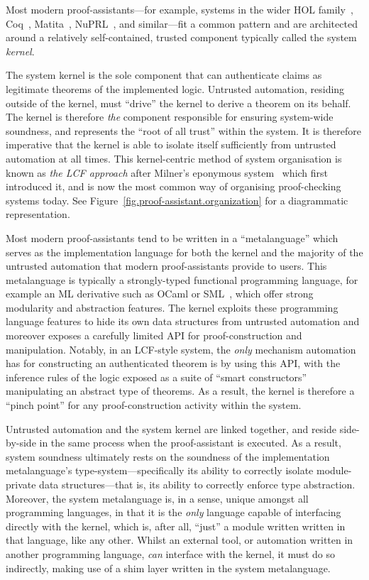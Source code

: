 \documentclass[a4paper, UKenglish, cleveref, autoref, thm-restate, colorlinks]{lipics-v2021}
\begin{document}
Most modern proof-assistants---for example, systems in the wider HOL family~\cite{10.1007/s00165-019-00492-1, DBLP:conf/tphol/Harrison09a, DBLP:conf/tphol/SlindN08}, Coq~\cite{DBLP:conf/popl/HuetH14}, Matita~\cite{DBLP:conf/cade/AspertiRCT11}, NuPRL~\cite{DBLP:conf/cade/AllenCEKL00}, and similar---fit a common pattern and are architected around a relatively self-contained, trusted component typically called the system \emph{kernel}.

The system kernel is the sole component that can authenticate claims as legitimate theorems of the implemented logic.
Untrusted automation, residing outside of the kernel, must ``drive'' the kernel to derive a theorem on its behalf.
The kernel is therefore \emph{the} component responsible for ensuring system-wide soundness, and represents the ``root of all trust'' within the system.
It is therefore imperative that the kernel is able to isolate itself sufficiently from untrusted automation at all times.
This kernel-centric method of system organisation is known as \emph{the LCF approach} after Milner's eponymous system~\cite{DBLP:books/sp/Gordon79} which first introduced it, and is now the most common way of organising proof-checking systems today.
See Figure~\ref{fig.proof-assistant.organization} for a diagrammatic representation.

Most modern proof-assistants tend to be written in a ``metalanguage'' which serves as the implementation language for both the kernel and the majority of the untrusted automation that modern proof-assistants provide to users.
This metalanguage is typically a strongly-typed functional programming language, for example an ML derivative such as OCaml or SML~\cite{DBLP:books/daglib/0069232}, which offer strong modularity and abstraction features.
The kernel exploits these programming language features to hide its own data structures from untrusted automation and moreover exposes a carefully limited API for proof-construction and manipulation.
Notably, in an LCF-style system, the \emph{only} mechanism automation has for constructing an authenticated theorem is by using this API, with the inference rules of the logic exposed as a suite of ``smart constructors'' manipulating an abstract type of theorems.
As a result, the kernel is therefore a ``pinch point'' for any proof-construction activity within the system.

Untrusted automation and the system kernel are linked together, and reside side-by-side in the same process when the proof-assistant is executed.
As a result, system soundness ultimately rests on the soundness of the implementation metalanguage's type-system---specifically its ability to correctly isolate module-private data structures---that is, its ability to correctly enforce type abstraction.
Moreover, the system metalanguage is, in a sense, unique amongst all programming languages, in that it is the \emph{only} language capable of interfacing directly with the kernel, which is, after all, ``just'' a module written written in that language, like any other.
Whilst an external tool, or automation written in another programming language, \emph{can} interface with the kernel, it must do so indirectly, making use of a shim layer written in the system metalanguage.
\end{document}
